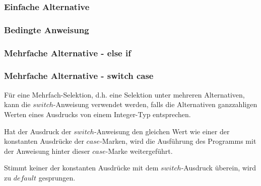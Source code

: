 		\begin{minipage}[t]{5.5 cm}
			\subsubsection{Einfache Alternative}
				
		\end{minipage}
		\begin{minipage}[t]{5.5 cm}
			\subsubsection{Bedingte Anweisung}
				
		\end{minipage}
		\begin{minipage}[t]{7 cm}
			\subsubsection{Mehrfache Alternative - else if}
				
		\end{minipage}

		\subsubsection{Mehrfache Alternative - switch case}
			\begin{minipage}[t]{9 cm}
				
				\begin{compactitem}
					\item Für eine Mehrfach-Selektion, d.h. eine Selektion unter mehreren Alternativen, kann die $switch$-Anweisung verwendet werden, falls die Alternativen ganzzahligen Werten eines Ausdrucks von einem Integer-Typ entsprechen.
					\item Hat der Ausdruck der $switch$-Anweisung den gleichen Wert wie einer der konstanten Ausdrücke der $case$-Marken, wird die Ausführung des Programms mit der Anweisung hinter dieser $case$-Marke weitergeführt.
					\item Stimmt keiner der konstanten Ausdrücke mit dem $switch$-Ausdruck überein, wird zu $default$ gesprungen.
				\end{compactitem}							
			\end{minipage}
			\hspace*{1cm}
			\begin{minipage}[t]{9 cm}
				\vspace*{-0.5cm}
				
			\end{minipage}
			
